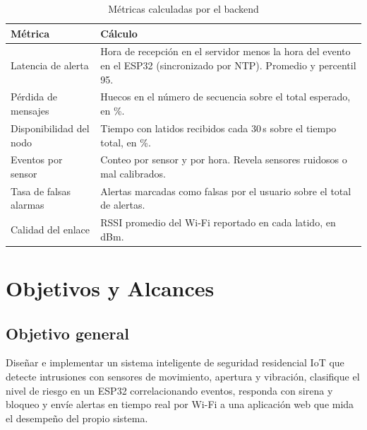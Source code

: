 \documentclass[conference]{IEEEtran}
\begin{document}
\begin{table}[!t]
\centering
\caption{Métricas calculadas por el backend}
\label{tab:metricas}
\footnotesize
\renewcommand{\arraystretch}{1.15}
\begin{tabular}{@{}>{\raggedright\arraybackslash}p{2.35cm}>{\raggedright\arraybackslash}p{5.65cm}@{}}
\toprule
\textbf{Métrica} & \textbf{Cálculo} \\
\midrule
Latencia de alerta & Hora de recepción en el servidor menos la hora del evento en el ESP32 (sincronizado por NTP). Promedio y percentil 95. \\
Pérdida de mensajes & Huecos en el número de secuencia sobre el total esperado, en \%. \\
Disponibilidad del nodo & Tiempo con latidos recibidos cada 30\,s sobre el tiempo total, en \%. \\
Eventos por sensor & Conteo por sensor y por hora. Revela sensores ruidosos o mal calibrados. \\
Tasa de falsas alarmas & Alertas marcadas como falsas por el usuario sobre el total de alertas. \\
Calidad del enlace & RSSI promedio del Wi-Fi reportado en cada latido, en dBm. \\
\bottomrule
\end{tabular}
\end{table}

\section{Objetivos y Alcances}
\label{sec:objetivos}

\subsection{Objetivo general}
Diseñar e implementar un sistema inteligente de seguridad residencial IoT que detecte intrusiones con sensores de movimiento, apertura y vibración, clasifique el nivel de riesgo en un ESP32 correlacionando eventos, responda con sirena y bloqueo y envíe alertas en tiempo real por Wi-Fi a una aplicación web que mida el desempeño del propio sistema.
\end{document}
